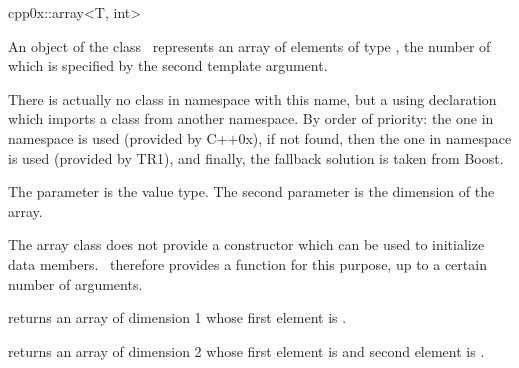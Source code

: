 

\begin{ccRefClass}{cpp0x::array<T, int>}

\ccDefinition

An object of the class \ccClassTemplateName\ represents an array of elements
of type , the number of which is specified by the second template argument.

There is actually no class in namespace  with this name, but a using declaration which
imports a class from another namespace.  By order of priority: the one in namespace
 is used (provided by C++0x), if not found, then the one in namespace
 is used (provided by TR1), and finally, the fallback solution 
is taken from Boost.


  \ccParameters

  The parameter  is the value type.  The second parameter is the
  dimension of the array.


  The array class does not provide a constructor which can be used to initialize
  data members.  \cgal\ therefore provides a  function for
  this purpose, up to a certain number of arguments.

  \def\ccTagRmEigenClassName{\ccFalse}
  {returns an array of dimension 1 whose first element is .}

  {returns an array of dimension 2 whose first element is 
   and second element is .}

\end{ccRefClass}

\ccParDims

